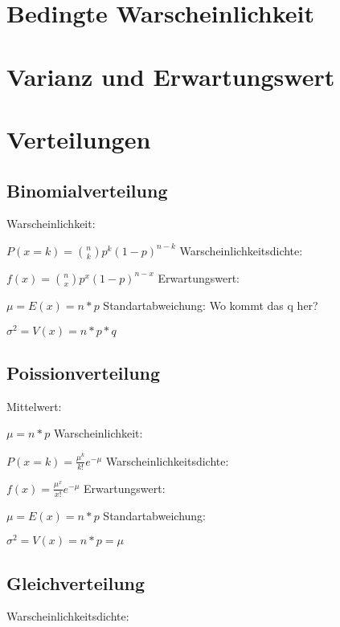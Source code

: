 \documentclass[a4paper, 11pt]{article}
\begin{document}
\section{Bedingte Warscheinlichkeit}
\section{Varianz und Erwartungswert}
\section{Verteilungen}
\subsection{Binomialverteilung}
Warscheinlichkeit:

\newline $P(x=k) = \binom{n}{k} p^k (1-p)^{n-k}$
\newline\newline Warscheinlichkeitsdichte:

$f(x) = \binom{n}{x} p^x(1-p)^{n-x}$
\newline\newline Erwartungswert:

$\mu = E(x) = n * p$
\newline\newline Standartabweichung:
Wo kommt das q her?

$\sigma^2 = V(x)= n * p * q$
\subsection{Poissionverteilung}
Mittelwert:

$\mu = n * p$
\newline\newline Warscheinlichkeit:

$P(x=k) = \frac{\mu^k} {k!} e^{-\mu}$
\newline\newline Warscheinlichkeitsdichte:

$f(x) = \frac{\mu^x} {x!} e^{-\mu}$
\newline\newline Erwartungswert:

$\mu = E(x) = n * p$
\newline\newline Standartabweichung:

$\sigma^2 = V(x)= n * p = \mu $
\subsection{Gleichverteilung}
Warscheinlichkeitsdichte:
\end{document}
